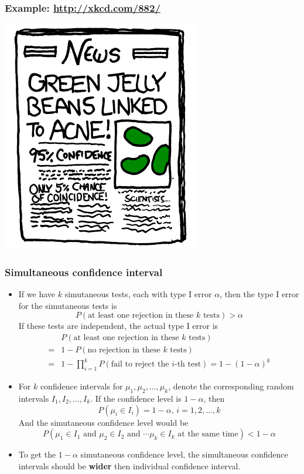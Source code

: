 \documentclass[handout]{beamer}\usepackage[]{graphicx}\usepackage[]{color}
\numberwithin{equation}{section}
\begin{document}
\begin{frame}
\frametitle{Example: \url{http://xkcd.com/882/}}
\begin{center}
 \includegraphics{../../fig/xkcd4.png}
\end{center}
\end{frame}

\begin{frame}
\frametitle{Simultaneous confidence interval}
\scriptsize
\begin{itemize}
\item
If we have $k$ simutaneous tests, each with type I error $\alpha$, then the type I error for the simutaneous tests is
\[P(\mbox{at least one rejection in these $k$ tests}) > \alpha\]
If these tests are independent, the actual type I error is
\begin{align*}
&P(\mbox{at least one rejection in these $k$ tests}) \\
=& 1 - P(\mbox{no rejection in these $k$ tests}) \\
=& 1 - \prod_{i=1}^k P(\mbox{fail to reject the $i$-th test}) = 1 - (1 - \alpha)^k
\end{align*}
\item
For $k$ confidence intervals for $\mu_1, \mu_2, \ldots, \mu_k$, denote the corresponding random intervals $I_1, I_2, \ldots, I_k$. If the confidence level is $1 - \alpha$, then
\[P(\mu_i \in I_i) = 1 - \alpha,\, i = 1, 2, \ldots, k\]
And the simutaneous confidence level would be
\[P(\mbox{$\mu_1 \in I_1$ and $\mu_2 \in I_2$ and $\cdots \mu_k \in I_k$ at the same time} ) < 1 - \alpha\]
\item
To get the $1 - \alpha$ simutaneous confidence level, the simultaneous confidence intervals should be {\bf wider} then individual confidence interval.
\end{itemize}
\end{frame}
\end{document}
